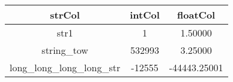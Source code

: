 \begin{tabular}{|c|c|c|}
	\hline
	strCol & intCol & floatCol \\
	\hline
	str1 & 1 & 1.50000 \\
	\hline
	string\_tow & 532993 & 3.25000 \\
	\hline
	long\_long\_long\_long\_str & -12555 & -44443.25001 \\
	\hline
\end{tabular}